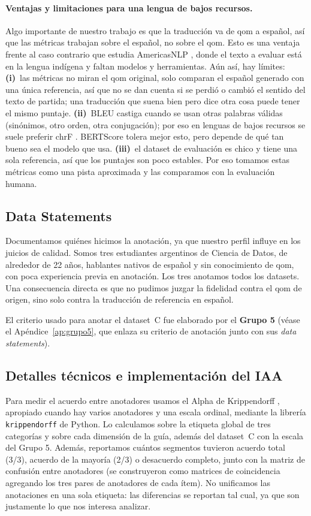 \paragraph{Ventajas y limitaciones para una lengua de bajos recursos.}
Algo importante de nuestro trabajo es que la traducción va de qom a español, así
que las métricas trabajan sobre el español, no sobre el qom. Esto es una
ventaja frente al caso contrario que estudia AmericasNLP \citep{degibert2025findings},
donde el texto a evaluar está en la lengua indígena y faltan modelos y
herramientas. Aún así, hay límites: \textbf{(i)}~las métricas no miran el qom
original, solo comparan el español generado con una única referencia, así que no se
dan cuenta si se perdió o cambió el sentido del texto de partida; una traducción
que suena bien pero dice otra cosa puede tener el mismo puntaje.
\textbf{(ii)}~BLEU castiga cuando se usan otras palabras válidas (sinónimos, otro
orden, otra conjugación); por eso en lenguas de bajos recursos se suele preferir
chrF \citep{popovic2015chrf}. BERTScore tolera mejor esto, pero depende de qué tan
bueno sea el modelo que usa. \textbf{(iii)}~el dataset de evaluación es chico y
tiene una sola referencia, así que los puntajes son poco estables. Por eso tomamos
estas métricas como una pista aproximada y las comparamos con la evaluación humana.

\subsection{Data Statements}
\label{sec:metodologia-datastatements}
Documentamos quiénes hicimos la anotación, ya que nuestro perfil influye en los
juicios de calidad. Somos tres estudiantes argentinos de Ciencia de Datos, de
alrededor de 22 años, hablantes nativos de español y sin conocimiento de qom, con
poca experiencia previa en anotación. Los tres anotamos todos los datasets. Una
consecuencia directa es que no pudimos juzgar la fidelidad contra el qom de origen,
sino solo contra la traducción de referencia en español.

El criterio usado para anotar el dataset~C fue elaborado por el \textbf{Grupo 5}
(véase el Apéndice~\ref{ap:grupo5}, que enlaza su criterio de anotación junto con
sus \emph{data statements}).

\subsection{Detalles técnicos e implementación del IAA}
\label{sec:metodologia-tecnico}
Para medir el acuerdo entre anotadores usamos el Alpha de Krippendorff
\citep{krippendorff2018}, apropiado cuando hay varios anotadores y una escala
ordinal, mediante la librería \texttt{krippendorff} de Python. Lo calculamos sobre
la etiqueta global de tres categorías y sobre cada dimensión de la guía, además del
dataset~C con la escala del Grupo 5. Además, reportamos cuántos
segmentos tuvieron acuerdo total (3/3), acuerdo de la mayoría (2/3) o desacuerdo
completo, junto con la matriz de confusión entre anotadores (se construyeron como matrices de coincidencia agregando los tres pares
de anotadores de cada ítem). No unificamos las
anotaciones en una sola etiqueta: las diferencias se reportan tal cual, ya que son
justamente lo que nos interesa analizar.
